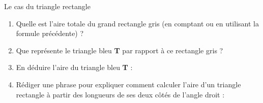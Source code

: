 \documentclass[a4paper]{book}
\begin{document}
    
    \begin{exerciceTitre}{Le cas du triangle rectangle}
        \begin{center}
        \end{center}
        
        \begin{enumerate}
            \item Quelle est l'aire totale du grand rectangle gris (en comptant ou en utilisant la formule précédente) ? \points[3]
            \item Que représente le triangle bleu \textbf{T} par rapport à ce rectangle gris ? \points[4]
            \item En déduire l'aire du triangle bleu \textbf{T} : \points[4]
            \item Rédiger une phrase pour expliquer comment calculer l'aire d'un triangle rectangle à partir des longueurs de ses deux côtés de l'angle droit : \newline
        \end{enumerate}
    \end{exerciceTitre}
\end{document}
